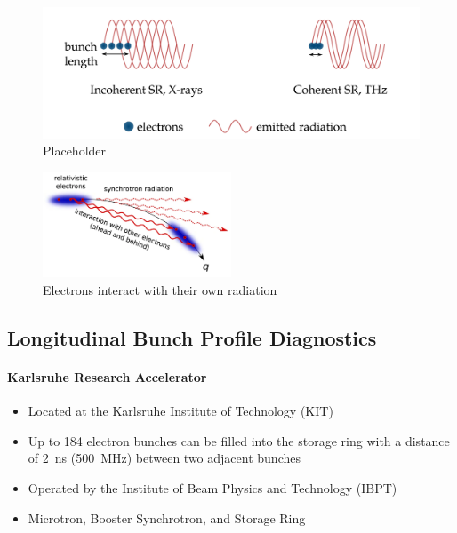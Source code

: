 \begin{figure}[tbh]
	\centering
	\includegraphics[width = \textwidth]{chap/02-theory/img/csr2.png}
	\caption{Placeholder \cite{rota2018}}
	\label{fig:csr}
\end{figure}

\begin{figure}[tbh]
	\centering
	\includegraphics[width = 0.5\textwidth]{chap/02-theory/img/microbunching}
	\caption{Electrons interact with their own radiation \cite{Bielawski2019}}
	\label{fig:microBunch}
\end{figure}


\subsection{Longitudinal Bunch Profile Diagnostics}
\paragraph{Karlsruhe Research Accelerator}
\begin{itemize}[noitemsep]
	\item Located at the Karlsruhe Institute of Technology (KIT)
	\item Up to 184 electron bunches can be filled into the storage ring with a distance of \SI{2}{\nano\second} (\SI{500}{\mega\hertz}) between two adjacent bunches
	\item Operated by the Institute of Beam Physics and Technology (IBPT)
	\item Microtron, Booster Synchrotron, and Storage Ring
\end{itemize}


